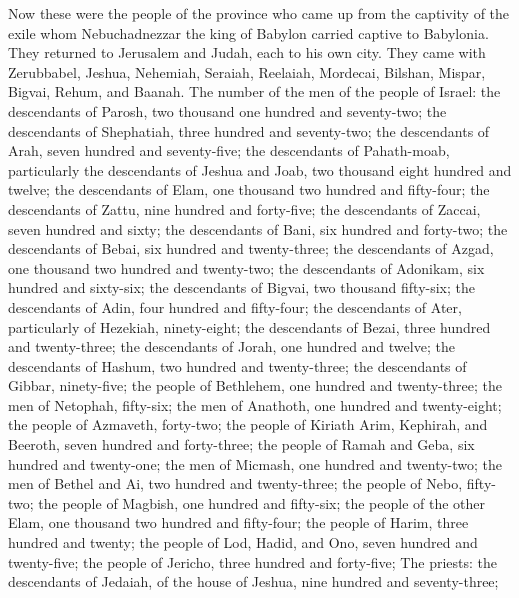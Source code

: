 \begin{biblechapter} %
 Now these were the people of the province who came up from the captivity of the exile whom Nebuchadnezzar the king of Babylon carried captive to Babylonia. They returned to Jerusalem and Judah, each to his own city.
\verse They came with Zerubbabel, Jeshua, Nehemiah, Seraiah, Reelaiah, Mordecai, Bilshan, Mispar, Bigvai, Rehum, and Baanah.
\verse The number of the men of the people of Israel:
\verse the descendants of Parosh, two thousand one hundred and seventy-two;
\verse the descendants of Shephatiah, three hundred and seventy-two;
\verse the descendants of Arah, seven hundred and seventy-five;
\verse the descendants of Pahath-moab, particularly the descendants of Jeshua and Joab, two thousand eight hundred and twelve;
\verse the descendants of Elam, one thousand two hundred and fifty-four;
\verse the descendants of Zattu, nine hundred and forty-five;
\verse the descendants of Zaccai, seven hundred and sixty;
\verse the descendants of Bani, six hundred and forty-two;
\verse the descendants of Bebai, six hundred and twenty-three;
\verse the descendants of Azgad, one thousand two hundred and twenty-two;
\verse the descendants of Adonikam, six hundred and sixty-six;
\verse the descendants of Bigvai, two thousand fifty-six;
\verse the descendants of Adin, four hundred and fifty-four;
\verse the descendants of Ater, particularly of Hezekiah, ninety-eight;
\verse the descendants of Bezai, three hundred and twenty-three;
\verse the descendants of Jorah, one hundred and twelve;
\verse the descendants of Hashum, two hundred and twenty-three;
\verse the descendants of Gibbar, ninety-five;
\verse the people of Bethlehem, one hundred and twenty-three;
\verse the men of Netophah, fifty-six;
\verse the men of Anathoth, one hundred and twenty-eight;
\verse the people of Azmaveth, forty-two;
\verse the people of Kiriath Αrim, Kephirah, and Beeroth, seven hundred and forty-three;
\verse the people of Ramah and Geba, six hundred and twenty-one;
\verse the men of Micmash, one hundred and twenty-two;
\verse the men of Bethel and Ai, two hundred and twenty-three;
\verse the people of Nebo, fifty-two;
\verse the people of Magbish, one hundred and fifty-six;
\verse the people of the other Elam, one thousand two hundred and fifty-four;
\verse the people of Harim, three hundred and twenty;
\verse the people of Lod, Hadid, and Ono, seven hundred and twenty-five;
\verse the people of Jericho, three hundred and forty-five;
\verse The priests: the descendants of Jedaiah, of the house of Jeshua, nine hundred and seventy-three;

\end{biblechapter}
